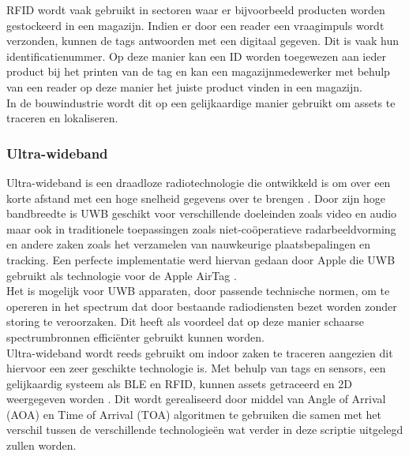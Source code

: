 
RFID wordt vaak gebruikt in sectoren waar er bijvoorbeeld producten worden gestockeerd in een magazijn. Indien er door een reader een vraagimpuls wordt verzonden, kunnen de tags antwoorden met een digitaal gegeven. Dit is vaak hun identificatienummer. Op deze manier kan een ID worden toegewezen aan ieder product bij het printen van de tag en kan een magazijnmedewerker met behulp van een reader op deze manier het juiste product vinden in een magazijn.\\

In de bouwindustrie wordt dit op een gelijkaardige manier gebruikt om assets te traceren en lokaliseren.\\


\subsubsection{Ultra-wideband}

Ultra-wideband is een draadloze radiotechnologie die ontwikkeld is om over een korte afstand met een hoge snelheid gegevens over te brengen \autocite{Rahayu2008}. Door zijn hoge bandbreedte is UWB geschikt voor verschillende doeleinden zoals video en audio maar ook in traditionele toepassingen zoals niet-coöperatieve radarbeeldvorming en andere zaken zoals het verzamelen van nauwkeurige plaatsbepalingen en tracking. Een perfecte implementatie werd hiervan gedaan door Apple die UWB gebruikt als technologie voor de Apple AirTag \autocite{Griffith2021}.\\

 Het is mogelijk voor UWB apparaten, door passende technische normen, om te opereren in het spectrum dat door bestaande radiodiensten bezet worden zonder storing te veroorzaken. Dit heeft als voordeel dat op deze manier schaarse spectrumbronnen efficiënter gebruikt kunnen worden.\\

Ultra-wideband wordt reeds gebruikt om indoor zaken te traceren aangezien dit hiervoor een zeer geschikte technologie is. Met behulp van tags en sensors, een gelijkaardig systeem als BLE en RFID, kunnen assets getraceerd en 2D weergegeven worden \autocite{Siddiqui2019}. Dit wordt gerealiseerd door middel van Angle of Arrival (AOA) en Time of Arrival (TOA) algoritmen te gebruiken die samen met het verschil tussen de verschillende technologieën wat verder in deze scriptie uitgelegd zullen worden.


